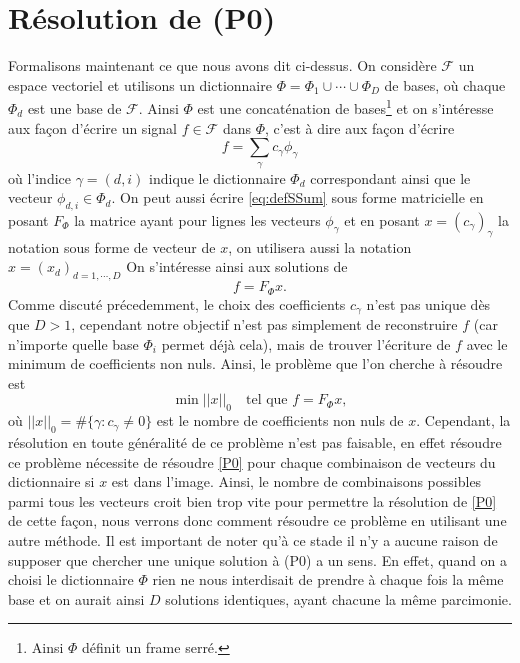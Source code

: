\section{Résolution de (P0)}
Formalisons maintenant ce que nous avons dit ci-dessus. 
On considère $\mathcal{F}$ un espace vectoriel et utilisons un dictionnaire $\Phi = \Phi_1 \cup \cdots \cup \Phi_D$ de bases, où chaque $\Phi_d$ est une base de $\mathcal{F}$. 
Ainsi $\Phi$ est une concaténation de bases\footnote{Ainsi $\Phi$ définit un frame serré.} et on s'intéresse aux façon d'écrire un signal $f\in \mathcal{F}$ dans $\Phi$, c'est à dire aux façon d'écrire
\begin{equation}\label{eq:defSSum}
	f = \sum_\gamma c_\gamma \phi_\gamma
\end{equation}
où l'indice $\gamma = (d, i)$ indique le dictionnaire $\Phi_d$ correspondant ainsi que le vecteur $\phi_{d, i} \in \Phi_d$.
On peut aussi écrire \ref{eq:defSSum} sous forme matricielle en posant $F_\Phi$ la matrice ayant pour lignes les vecteurs $\phi_\gamma$ et en posant $x = (c_\gamma)_\gamma$ la notation sous forme de vecteur de $x$, on utilisera aussi la notation $x = (x_d)_{d=1, \cdots, D}$
On s'intéresse ainsi aux solutions de 
\begin{equation}
	f = F_\Phi x.
\end{equation}
Comme discuté précedemment, le choix des coefficients $c_\gamma$ n'est pas unique dès que $D>1$, cependant notre objectif n'est pas simplement de reconstruire $f$ (car n'importe quelle base $\Phi_i$ permet déjà cela), mais de trouver l'écriture de $f$ avec le minimum de coefficients non nuls.
Ainsi, le problème que l'on cherche à résoudre est 
\begin{equation}\label{P0}\tag{P0}
	\min ||x||_0\quad \text{tel que } f = F_\Phi x,
\end{equation}
où $||x||_0 = \#\{\gamma : c_\gamma \neq 0\}$ est le nombre de coefficients non nuls de $x$.
Cependant, la résolution en toute généralité de ce problème n'est pas faisable, en effet résoudre ce problème nécessite de résoudre \ref{P0} pour chaque combinaison de vecteurs du dictionnaire si $x$ est dans l'image.
Ainsi, le nombre de combinaisons possibles parmi tous les vecteurs croit bien trop vite pour permettre la résolution de \ref{P0} de cette façon, nous verrons donc comment résoudre ce problème en utilisant une autre méthode.
\newline
Il est important de noter qu'à ce stade il n'y a aucune raison de supposer que chercher une unique solution à (P0) a un sens.
En effet, quand on a choisi le dictionnaire $\Phi$ rien ne nous interdisait de prendre à chaque fois la même base et on aurait ainsi $D$ solutions identiques, ayant chacune la même parcimonie.
